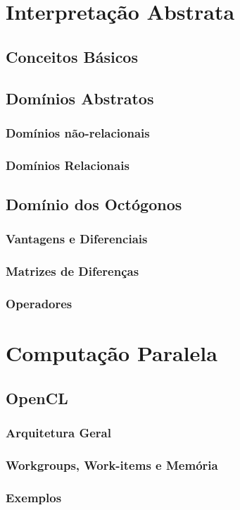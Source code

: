 \chapter{Interpretação Abstrata}
    \section{Conceitos Básicos}
    \section{Domínios Abstratos}
        \subsection{Domínios não-relacionais}
        \subsection{Domínios Relacionais}
    \section{Domínio dos Octógonos}
        \subsection{Vantagens e Diferenciais}
        \subsection{Matrizes de Diferenças}
        \subsection{Operadores}
\chapter{Computação Paralela}
    \section{OpenCL}
        \subsection{Arquitetura Geral}
        \subsection{Workgroups, Work-items e Memória}
        \subsection{Exemplos}
        